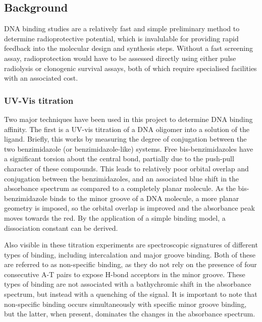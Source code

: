 \begin{refsection}
\subsection{Background}
DNA binding studies are a relatively fast and simple preliminary method to determine radioprotective potential, which is invalulable for providing rapid feedback into the molecular design and synthesis steps.
Without a fast screening assay, radioprotection would have to be assessed directly using either pulse radiolysis or clonogenic survival assays, both of which require specialised facilities with an associated cost.

\subsubsection{UV-Vis titration}
\label{sec:absorbance}
Two major techniques have been used in this project to determine DNA binding affinity.
The first is a UV-vis titration of a DNA oligomer into a solution of the ligand.
Briefly, this works by measuring the degree of conjugation between the two benzimidazole (or benzimidazole-like) systems.
Free bis-benzimidazoles have a significant torsion about the central bond, partially due to the push-pull character of these compounds.
This leads to relatively poor orbital overlap and conjugation between the benzimidazoles, and an associated blue shift in the absorbance spectrum as compared to a completely planar molecule.
As the bis-benzimidazole binds to the minor groove of a DNA molecule, a more planar geometry is imposed, so the orbital overlap is improved and the absorbance peak moves towards the red.
By the application of a simple binding model, a dissociation constant can be derived.

Also visible in these titration experiments are spectroscopic signatures of different types of binding, including intercalation and major groove binding.
Both of these are referred to as non-specific binding, as they do not rely on the presence of four consecutive A-T pairs to expose H-bond acceptors in the minor groove.
These types of binding are not associated with a bathychromic shift in the absorbance spectrum, but instead with a quenching of the signal.
It is important to note that non-specific binding occurs simultaneously with specific minor groove binding, but the latter, when present, dominates the changes in the absorbance spectrum.


\end{refsection}
